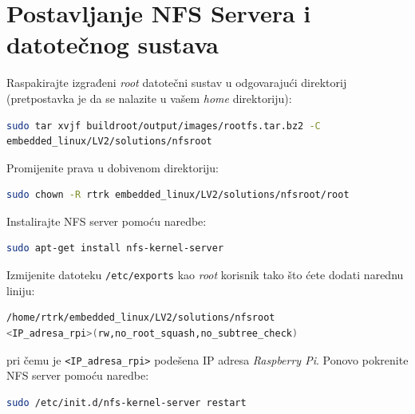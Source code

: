 \documentclass[11pt]{article}
\begin{document}
\section{Postavljanje NFS Servera i datotečnog sustava}
Raspakirajte izgrađeni \textit{root} datotečni sustav u odgovarajući direktorij
 (pretpostavka je da se nalazite u vašem \textit{home} direktoriju):
\begin{lstlisting}[language=bash]
sudo tar xvjf buildroot/output/images/rootfs.tar.bz2 -C
embedded_linux/LV2/solutions/nfsroot
\end{lstlisting}
Promijenite prava u dobivenom direktoriju:
\begin{lstlisting}[language=bash]
sudo chown -R rtrk embedded_linux/LV2/solutions/nfsroot/root
\end{lstlisting}
Instalirajte NFS server pomoću naredbe:
\begin{lstlisting}[language=bash]
sudo apt-get install nfs-kernel-server
\end{lstlisting}
Izmijenite datoteku \texttt{/etc/exports} kao \textit{root} korisnik tako što
 ćete dodati narednu liniju:
\begin{lstlisting}[language=bash]
/home/rtrk/embedded_linux/LV2/solutions/nfsroot
<IP_adresa_rpi>(rw,no_root_squash,no_subtree_check)
\end{lstlisting}
pri čemu je \texttt{<IP\_adresa\_rpi>} podešena IP adresa \textit{Raspberry Pi}.
Ponovo pokrenite NFS server pomoću naredbe:
\begin{lstlisting}[language=bash]
sudo /etc/init.d/nfs-kernel-server restart
\end{lstlisting}
\end{document}
